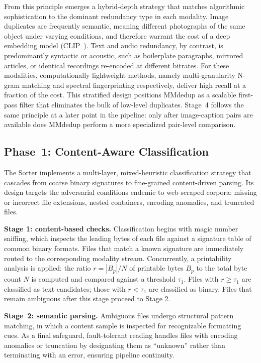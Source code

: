 \documentclass[conference]{IEEEtran}
\begin{document}
From this principle emerges a hybrid-depth strategy that matches algorithmic sophistication to the dominant redundancy type in each modality. Image duplicates are frequently semantic, meaning different photographs of the same object under varying conditions, and therefore warrant the cost of a deep embedding model (CLIP~\cite{radford2021learning}). Text and audio redundancy, by contrast, is predominantly syntactic or acoustic, such as boilerplate paragraphs, mirrored articles, or identical recordings re-encoded at different bitrates. For these modalities, computationally lightweight methods, namely multi-granularity N-gram matching and spectral fingerprinting respectively, deliver high recall at a fraction of the cost. This stratified design positions MMdedup as a scalable first-pass filter that eliminates the bulk of low-level duplicates. Stage~4 follows the same principle at a later point in the pipeline: only after image-caption pairs are available does MMdedup perform a more specialized pair-level comparison.


\subsection{Phase~1: Content-Aware Classification}

The Sorter implements a multi-layer, mixed-heuristic classification strategy that cascades from coarse binary signatures to fine-grained content-driven parsing. Its design targets the adversarial conditions endemic to web-scraped corpora: missing or incorrect file extensions, nested containers, encoding anomalies, and truncated files.

\textbf{Stage 1: content-based checks.}
Classification begins with magic number sniffing, which inspects the leading bytes of each file against a signature table of common binary formats. Files that match a known signature are immediately routed to the corresponding modality stream. Concurrently, a printability analysis is applied: the ratio $r = |B_p| / N$ of printable bytes $B_p$ to the total byte count $N$ is computed and compared against a threshold $\tau_1$. Files with $r \geq \tau_1$ are classified as text candidates; those with $r < \tau_1$ are classified as binary. Files that remain ambiguous after this stage proceed to Stage 2.

\textbf{Stage~2: semantic parsing.}
Ambiguous files undergo structural pattern matching, in which a content sample is inspected for recognizable formatting cues. As a final safeguard, fault-tolerant reading handles files with encoding anomalies or truncation by designating them as ``unknown'' rather than terminating with an error, ensuring pipeline continuity. 
\end{document}
